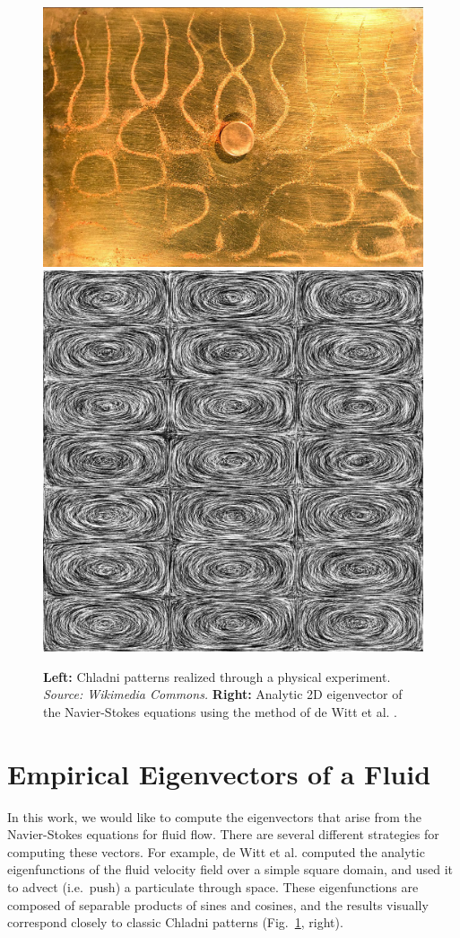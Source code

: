 \documentclass[11pt]{article}
\begin{document}
\begin{figure}
		\centering
		\includegraphics[height=0.3\textwidth]{Figures/chladni_plate.jpg}
		\includegraphics[height=0.3\textwidth]{Figures/LIC.jpg}
		\caption{{\bf Left:} Chladni patterns realized through a physical experiment. {\em Source: Wikimedia Commons.} {\bf Right:} Analytic 2D eigenvector of the Navier-Stokes equations using the method of de Witt et al. \cite{deWitt:2012}.}
		\label{fig:chladni-plate}
\end{figure}

\section*{Empirical Eigenvectors of a Fluid}

In this work, we would like to compute the eigenvectors that arise from the Navier-Stokes equations for fluid flow. There are several different strategies for computing these vectors. For example, de Witt et al. \cite{deWitt:2012} computed the analytic eigenfunctions of the fluid velocity field over a simple square domain, and used it to advect (i.e.~push) a particulate through space. These eigenfunctions are composed of separable products of sines and cosines, and the results visually correspond closely to classic Chladni patterns (Fig.~\ref{fig:chladni-plate}, right).
\end{document}
